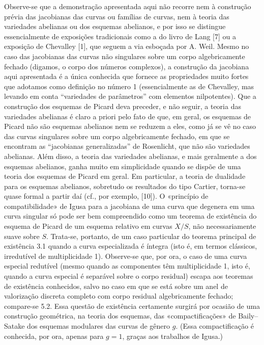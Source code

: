  Observe-se que a demonstração apresentada aqui não
recorre nem à construção prévia das jacobianas das curvas ou famílias de curvas,
nem à teoria das variedades abelianas ou dos esquemas abelianos, e por isso se
distingue essencialmente de exposições tradicionais como a do livro de Lang [7]
ou a exposição de Chevalley [1], que seguem a via esboçada por A. Weil. Mesmo no
caso das jacobianas das curvas não singulares sobre um corpo algebricamente
fechado (digamos, o corpo dos números complexos), a construção da jacobiana aqui
apresentada é a única conhecida que fornece as propriedades muito fortes que
adotamos como definição no número 1 (essencialmente as de Chevalley, mas levando
em conta ``variedades de parâmetros'' com elementos nilpotentes). Que a
construção dos esquemas de Picard deva preceder, e não seguir, a teoria das
variedades abelianas é claro a priori pelo fato de que, em geral, os esquemas de
Picard não são esquemas abelianos nem se reduzem a eles, como já se vê no caso
das curvas singulares sobre um corpo algebricamente fechado, em que se encontram
as ``jacobianas generalizadas'' de Rosenlicht, que não são variedades abelianas.
Além disso, a teoria das variedades abelianas, e mais geralmente a dos esquemas
abelianos, ganha muito em simplicidade quando se dispõe de uma teoria dos
esquemas de Picard em geral. Em particular, a teoria de dualidade para os
esquemas abelianos, sobretudo os resultados do tipo Cartier, torna-se quase
formal a partir daí (cf., por exemplo, [10]).
 O «princípio de compatibilidade» de Igusa para a
jacobiana de uma curva que degenera em uma curva singular só pode ser bem
compreendido como um teorema de existência do esquema de Picard de um esquema
relativo em curvas $X/S$, não necessariamente suave sobre $S$. Trata-se,
portanto, de um caso particular do teorema principal de existência 3.1 quando a
curva especializada é íntegra (isto é, em termos clássicos, irredutível de
multiplicidade 1). Observe-se que, por ora, o caso de uma curva especial
redutível (mesmo quando as componentes têm multiplicidade 1, isto é, quando a
curva especial é separável sobre o corpo residual) escapa aos teoremas de
existência conhecidos, salvo no caso em que se está sobre um anel de valorização
discreta completo com corpo residual algebricamente fechado; compare-se 5.2.
Essa questão de existência certamente surgirá por ocasião de uma construção
geométrica, na teoria dos esquemas, das «compactificações» de Baily--Satake dos
esquemas modulares das curvas de gênero $g$. (Essa compactificação é conhecida,
por ora, apenas para $g=1$, graças aos trabalhos de Igusa.)

